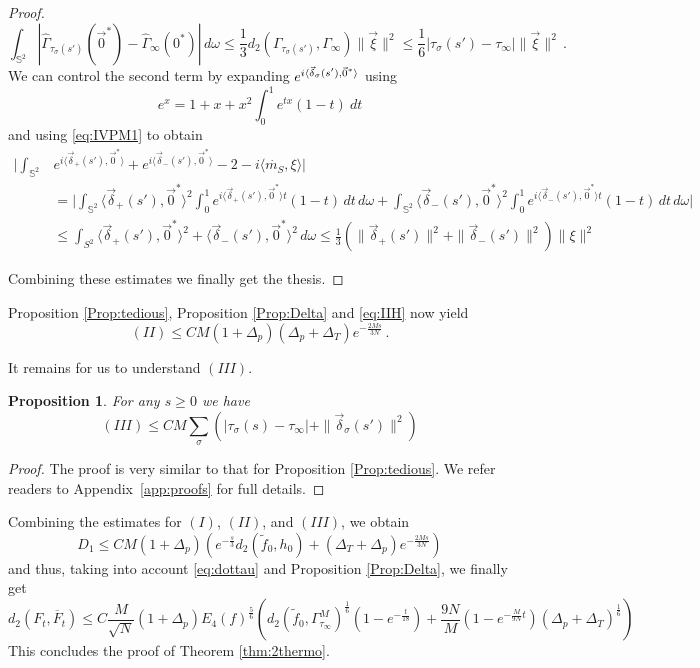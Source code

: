 \documentclass{article}
\newcommand\vxi{{\vec \xi}}
\newtheorem{Prop}{Proposition}
\DeclarePairedDelimiter{\scal}{\langle}{\rangle}
\begin{document}
\begin{proof}
\[
 \int_{\mathds S^2} \left| \widehat \Gamma_{\tau_\sigma(s')}(\vec 0^*)  - \widehat \Gamma_{\infty}(0^*)\right|
 \, d\omega \leq \frac 1 3 d_2(\Gamma_{\tau_\sigma(s')}, \Gamma_\infty)\|\vxi\|^2 \leq \frac 1 6 |\tau_\sigma(s') - 
 \tau_\infty|\|\vxi\|^2 \, .
\]
We can control the second term by expanding $e^{i\scal{\vec \delta_\sigma(s'),\vec 0^*}}$ using 
\begin{equation*}
e^{x} = 1 + x + x^2\int_0^1 e^{tx}(1 - t) \ dt
\end{equation*}
and using \eqref{eq:IVPM1} to obtain
\begin{align*}
\bigg|\int_{\mathds
S^2} &e^{i\langle\vec \delta_+(s'),\vec 0^*\rangle} + e^{i\langle\vec \delta_-(s'),\vec 0^*\rangle}
-2 - i\langle \dot{m_S}, \xi\rangle \bigg|
\\
&=
\bigg|
\int_{\mathds S^2} \langle\vec \delta_+(s'),\vec 0^*\rangle^2 \int_0^1 e^{i\langle\vec \delta_+(s'),\vec 0^*\rangle t} 
(1 - 
t)\, dt \, d\omega + 
\int_{\mathds S^2} \langle\vec \delta_-(s'),\vec 0^*\rangle^2\int_0^1 e^{i\langle\vec \delta_-(s'),\vec 0^*\rangle t} 
(1 - t)\, 
dt \, d\omega \bigg|
\\
&\leq 
\int_{S^2} \langle\vec \delta_+(s'),\vec 0^*\rangle^2 + \langle\vec \delta_-(s'),\vec 0^*\rangle^2 \, d\omega 
\leq
\frac 1 3 \left(\|\vec \delta_+(s')\|^2  + \|\vec \delta_-(s')\|^2\right) \|\xi\|^2 
\end{align*}

Combining these estimates we finally get the thesis.
\end{proof}

Proposition \ref{Prop:tedious}, Proposition \ref{Prop:Delta} and \eqref{eq:IIH} now yield
\[
(II) \leq C M (1 + \Delta_p) (\Delta_p+\Delta_T)e^{-\frac {2Ms}{3N}}\, .
\]


It remains for us to understand $(III).$ 
\begin{Prop}\label{Prop:Theta}
For any $s \geq 0$ we have
\[
 (III)\leq
C M\sum_\sigma  \left(|\tau_\sigma(s) - \tau_\infty| + \|\vec \delta_\sigma(s')\|^2\right)
\]
\end{Prop}
\begin{proof} The proof is very similar to that for Proposition \ref{Prop:tedious}. We refer readers to
Appendix~\ref{app:proofs} for full details.\end{proof}


Combining the estimates for $(I)$, $(II)$, and $(III)$, we obtain
\begin{equation}\label{eq:slow}
D_1\leq CM(1+\Delta_p) \left(e^{-\frac s3}d_2(\tilde f_0, h_0) +(\Delta_T+\Delta_p)e^{-\frac {2Ms}{3N}}\right)
\end{equation}
and thus, taking into account \eqref{eq:dottau} and Proposition \ref{Prop:Delta}, we finally get
\begin{equation}\label{eq:fullt2}
d_2(F_t, \overline F_t) \leq C\frac M{\sqrt N}(1+\Delta_p)E_4(f)^{\frac56}\left(d_2(\tilde f_0, 
\Gamma^M_{\tau_\infty})^{\frac 
16}\left(1-e^{-\frac t{18}}\right)+
\frac {9N}M\left(1-e^{-\frac {M}{9N}t}\right)(\Delta_p+\Delta_T)^{\frac 
16}\right)
\end{equation}
%
This concludes the proof of Theorem \ref{thm:2thermo}. 
\end{document}
